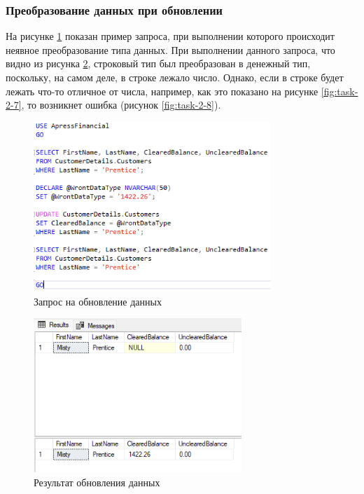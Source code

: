 \documentclass[a4paper, 14pt]{extarticle}
\begin{document}
\subsubsection{Преобразование данных при обновлении}

На рисунке \ref{fig:task-2-5} показан пример запроса, при выполнении которого
происходит неявное преобразование типа данных. При выполнении данного запроса,
что видно из рисунка \ref{fig:task-2-6}, строковый тип был преобразован в
денежный тип, поскольку, на самом деле, в строке лежало число. Однако, если в
строке будет лежать что-то отличное от числа, например, как это показано на
рисунке \ref{fig:task-2-7}, то возникнет ошибка (рисунок \ref{fig:task-2-8}).

\begin{figure}[H]
  \centering
  \includegraphics[width=0.8\textwidth]{images/task-2/5.png}
  \caption{Запрос на обновление данных}
  \label{fig:task-2-5}
\end{figure}

\begin{figure}[H]
  \centering
  \includegraphics[width=0.7\textwidth]{images/task-2/6.png}
  \caption{Результат обновления данных}
  \label{fig:task-2-6}
\end{figure}
\end{document}
